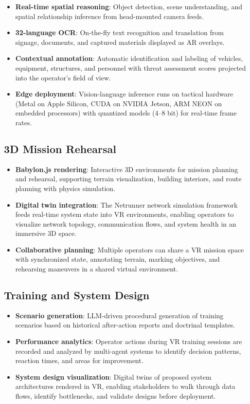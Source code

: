 \documentclass[11pt,letterpaper]{article}
\begin{document}
\begin{itemize}
\item \textbf{Real-time spatial reasoning}: Object detection, scene understanding, and spatial relationship inference from head-mounted camera feeds.
\item \textbf{32-language OCR}: On-the-fly text recognition and translation from signage, documents, and captured materials displayed as AR overlays.
\item \textbf{Contextual annotation}: Automatic identification and labeling of vehicles, equipment, structures, and personnel with threat assessment scores projected into the operator's field of view.
\item \textbf{Edge deployment}: Vision-language inference runs on tactical hardware (Metal on Apple Silicon, CUDA on NVIDIA Jetson, ARM NEON on embedded processors) with quantized models (4--8 bit) for real-time frame rates.
\end{itemize}

\subsection{3D Mission Rehearsal}

\begin{itemize}
\item \textbf{Babylon.js rendering}: Interactive 3D environments for mission planning and rehearsal, supporting terrain visualization, building interiors, and route planning with physics simulation.
\item \textbf{Digital twin integration}: The Netrunner network simulation framework feeds real-time system state into VR environments, enabling operators to visualize network topology, communication flows, and system health in an immersive 3D space.
\item \textbf{Collaborative planning}: Multiple operators can share a VR mission space with synchronized state, annotating terrain, marking objectives, and rehearsing maneuvers in a shared virtual environment.
\end{itemize}

\subsection{Training and System Design}

\begin{itemize}
\item \textbf{Scenario generation}: LLM-driven procedural generation of training scenarios based on historical after-action reports and doctrinal templates.
\item \textbf{Performance analytics}: Operator actions during VR training sessions are recorded and analyzed by multi-agent systems to identify decision patterns, reaction times, and areas for improvement.
\item \textbf{System design visualization}: Digital twins of proposed system architectures rendered in VR, enabling stakeholders to walk through data flows, identify bottlenecks, and validate designs before deployment.
\end{itemize}
\end{document}
